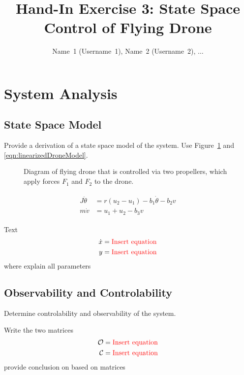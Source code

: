 \documentclass[a4paper,10pt,oneside]{article}
\begin{document}
\title{Hand-In Exercise 3: State Space Control of Flying Drone}
\author{{\color{red}Name~1 (Username~1), Name~2 (Username~2), $\dots$}}
\date{}
\maketitle

\section{System Analysis}
\subsection{State Space Model}
{\color{red}Provide a derivation of a state space model of the system. Use Figure~\ref{fig:sketchQuadrotor} and \eqref{eqn:linearizedDroneModel}.}
\begin{figure}[ht]
\centering
\graphicspath{{figures/}}

\caption{Diagram of flying drone that is controlled via two propellers, which apply forces $F_1$ and $F_2$ to the drone.}
\label{fig:sketchQuadrotor}
\end{figure}
\begin{align}
\begin{split}
J\ddot{\theta}&=r(u_2-u_1)-b_1\dot{\theta}-b_2v\\
m\dot{v}&=u_1+u_2-b_3v
\end{split}\label{eqn:linearizedDroneModel}
\end{align}

\begin{tcolorbox}
{\color{red}Text}
\begin{align*}
\dot{x} &= \text{\color{red}Insert equation}\\
y &= \text{\color{red}Insert equation}
\end{align*}
where {\color{red}explain all parameters}
\end{tcolorbox}

\subsection{Observability and Controlability}
{\color{red}Determine controlability and observability of the system.}

\begin{tcolorbox}
{\color{red}Write the two matrices}
\begin{align*}
\mathcal{O} &= \text{\color{red}Insert equation}\\
\mathcal{C} &= \text{\color{red}Insert equation}
\end{align*}
{\color{red}provide conclusion on based on matrices}
\end{tcolorbox}
\end{document}
